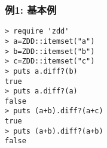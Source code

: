 \subsubsection*{例1: 基本例}



\begin{Verbatim}[baselinestretch=0.7,frame=single]
> require 'zdd'
> a=ZDD::itemset("a")
> b=ZDD::itemset("b")
> c=ZDD::itemset("c")
> puts a.diff?(b)
true
> puts a.diff?(a)
false
> puts (a+b).diff?(a+c)
true
> puts (a+b).diff?(a+b)
false
\end{Verbatim}
